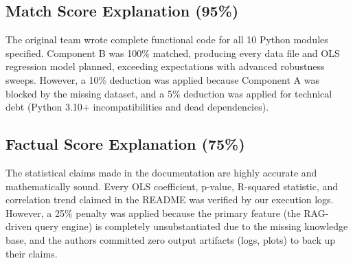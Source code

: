\documentclass[12pt]{article}
\begin{document}
\subsection{Match Score Explanation (95\%)}
The original team wrote complete functional code for all 10 Python modules specified. Component B was 100\% matched, producing every data file and OLS regression model planned, exceeding expectations with advanced robustness sweeps. However, a 10\% deduction was applied because Component A was blocked by the missing dataset, and a 5\% deduction was applied for technical debt (Python 3.10+ incompatibilities and dead dependencies).

\subsection{Factual Score Explanation (75\%)}
The statistical claims made in the documentation are highly accurate and mathematically sound. Every OLS coefficient, p-value, R-squared statistic, and correlation trend claimed in the README was verified by our execution logs. However, a 25\% penalty was applied because the primary feature (the RAG-driven query engine) is completely unsubstantiated due to the missing knowledge base, and the authors committed zero output artifacts (logs, plots) to back up their claims.
\end{document}
